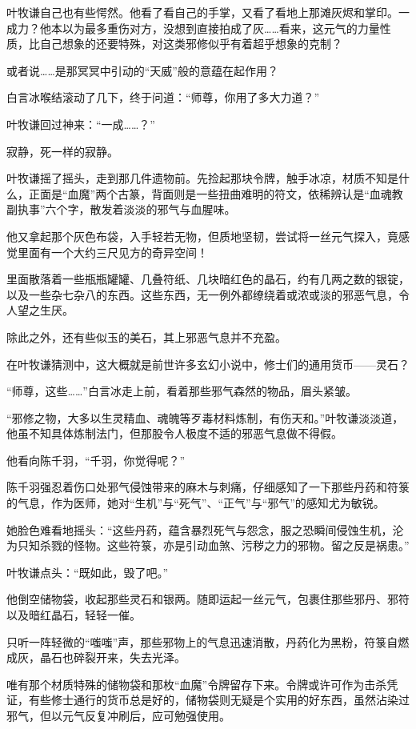 叶牧谦自己也有些愕然。他看了看自己的手掌，又看了看地上那滩灰烬和掌印。一成力？他本以为最多重伤对方，没想到直接拍成了灰……看来，这元气的力量性质，比自己想象的还要特殊，对这类邪修似乎有着超乎想象的克制？

或者说……是那冥冥中引动的“天威”般的意蕴在起作用？

白言冰喉结滚动了几下，终于问道：“师尊，你用了多大力道？”

叶牧谦回过神来：“一成……？”

寂静，死一样的寂静。

\vspace{2em}

叶牧谦摇了摇头，走到那几件遗物前。先捡起那块令牌，触手冰凉，材质不知是什么，正面是“血魔”两个古篆，背面则是一些扭曲难明的符文，依稀辨认是“血魂教副执事”六个字，散发着淡淡的邪气与血腥味。

他又拿起那个灰色布袋，入手轻若无物，但质地坚韧，尝试将一丝元气探入，竟感觉里面有一个大约三尺见方的奇异空间！

里面散落着一些瓶瓶罐罐、几叠符纸、几块暗红色的晶石，约有几两之数的银锭，以及一些杂七杂八的东西。这些东西，无一例外都缭绕着或浓或淡的邪恶气息，令人望之生厌。

除此之外，还有些似玉的美石，其上邪恶气息并不充盈。

在叶牧谦猜测中，这大概就是前世许多玄幻小说中，修士们的通用货币——灵石？

“师尊，这些……”白言冰走上前，看着那些邪气森然的物品，眉头紧皱。

“邪修之物，大多以生灵精血、魂魄等歹毒材料炼制，有伤天和。”叶牧谦淡淡道，他虽不知具体炼制法门，但那股令人极度不适的邪恶气息做不得假。

他看向陈千羽，“千羽，你觉得呢？”

陈千羽强忍着伤口处邪气侵蚀带来的麻木与刺痛，仔细感知了一下那些丹药和符箓的气息，作为医师，她对“生机”与“死气”、“正气”与“邪气”的感知尤为敏锐。

她脸色难看地摇头：“这些丹药，蕴含暴烈死气与怨念，服之恐瞬间侵蚀生机，沦为只知杀戮的怪物。这些符箓，亦是引动血煞、污秽之力的邪物。留之反是祸患。”

叶牧谦点头：“既如此，毁了吧。”

他倒空储物袋，收起那些灵石和银两。随即运起一丝元气，包裹住那些邪丹、邪符以及暗红晶石，轻轻一催。

只听一阵轻微的“嗤嗤”声，那些邪物上的气息迅速消散，丹药化为黑粉，符箓自燃成灰，晶石也碎裂开来，失去光泽。

唯有那个材质特殊的储物袋和那枚“血魔”令牌留存下来。令牌或许可作为击杀凭证，有些修士通行的货币总是好的，储物袋则无疑是个实用的好东西，虽然沾染过邪气，但以元气反复冲刷后，应可勉强使用。

